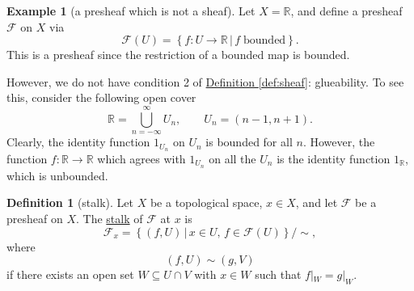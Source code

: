 \documentclass[a4paper,10pt]{scrreprt}
\newcommand{\R}{\mathbb{R}}
\newcommand{\defn}[1]{\ul{#1}}
\theoremstyle{definition}
\newtheorem{definition}{Definition}[section]
\newtheorem{example}{Example}[section]
\theoremstyle{plain}
\theoremstyle{remark}
\begin{document}
\begin{example}[a presheaf which is not a sheaf]
  \label{eg:presheafwhichisnotasheaf}
  Let $X = \R$, and define a presheaf $\mathcal{F}$ on $X$ via
  \begin{equation*}
    \mathcal{F}(U) = \left\{ f\colon U \to \R\, \big|\, f\;\mathrm{ bounded} \right\}.
  \end{equation*}
  This is a presheaf since the restriction of a bounded map is bounded.

  However, we do not have condition 2 of \hyperref[def:sheaf]{Definition \ref*{def:sheaf}}: glueability. To see this, consider the following open cover
  \begin{equation*}
    \R = \bigcup_{n=-\infty}^{\infty} U_{n}, \qquad U_{n} = (n-1, n+1).
  \end{equation*}
  Clearly, the identity function $1_{U_{n}}$ on $U_{n}$ is bounded for all $n$. However, the function $f:\R \to \R$ which agrees with $1_{U_{n}}$ on all the $U_{n}$ is the identity function $1_{\R}$, which is unbounded.

\end{example}


\begin{definition}[stalk]
  \label{def:stalk}
  Let $X$ be a topological space, $x \in X$, and let $\mathcal{F}$ be a presheaf on $X$. The \defn{stalk} of $\mathcal{F}$ at $x$ is
  \begin{equation*}
    \mathcal{F}_{x} = \left\{ \left( f, U \right)\,\big|\, x \in U,\, f \in \mathcal{F}(U) \right\}/\sim,
  \end{equation*}
  where 
  \begin{equation*}
    \left( f, U \right) \sim \left( g, V \right)
  \end{equation*}
  if there exists an open set $W \subseteq U \cap V$ with $x\in W$ such that $f|_{W} = g|_{W}$.
\end{definition}
\end{document}
